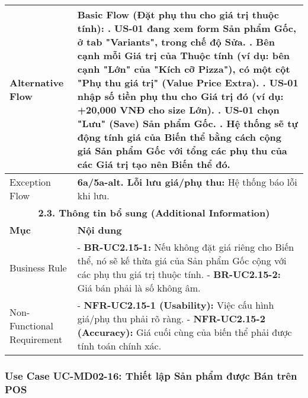 \begin{longtable}{|m{4cm}|p{11cm}|}
\hline
Alternative Flow & \textbf{Basic Flow (Đặt phụ thu cho giá trị thuộc tính):} \newline    1. US-01 đang xem form Sản phẩm Gốc, ở tab "Variants", trong chế độ Sửa. \newline    2. Bên cạnh mỗi Giá trị của Thuộc tính (ví dụ: bên cạnh "Lớn" của "Kích cỡ Pizza"), có một cột "Phụ thu giá trị" (Value Price Extra). \newline    3. US-01 nhập số tiền phụ thu cho Giá trị đó (ví dụ: +20,000 VNĐ cho size Lớn). \newline    4. US-01 chọn "Lưu" (Save) Sản phẩm Gốc. \newline    5. Hệ thống sẽ tự động tính giá của Biến thể bằng cách cộng giá Sản phẩm Gốc với tổng các phụ thu của các Giá trị tạo nên Biến thể đó. \\
\hline
Exception Flow & \textbf{6a/5a-alt. Lỗi lưu giá/phụ thu:} Hệ thống báo lỗi khi lưu. \\
\hline
\multicolumn{2}{|c|}{\textbf{2.3. Thông tin bổ sung (Additional Information)}} \\
\hline
\textbf{Mục} & \textbf{Nội dung} \\
\hline
Business Rule & - \textbf{BR-UC2.15-1:} Nếu không đặt giá riêng cho Biến thể, nó sẽ kế thừa giá của Sản phẩm Gốc cộng với các phụ thu giá trị thuộc tính. \newline - \textbf{BR-UC2.15-2:} Giá bán phải là số không âm. \\
\hline
Non-Functional Requirement & - \textbf{NFR-UC2.15-1 (Usability):} Việc cấu hình giá/phụ thu phải rõ ràng. \newline - \textbf{NFR-UC2.15-2 (Accuracy):} Giá cuối cùng của biến thể phải được tính toán chính xác. \\
\hline
\end{longtable}

\subsubsection{Use Case UC-MD02-16: Thiết lập Sản phẩm được Bán trên POS}

